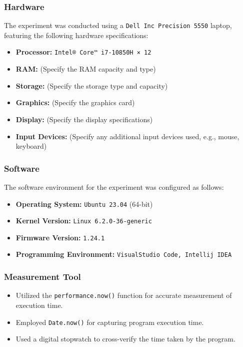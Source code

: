 \documentclass{article}
\begin{document}
\subsubsection*{Hardware}
The experiment was conducted using a \texttt{Dell Inc Precision 5550} laptop, featuring the following hardware specifications:
\begin{itemize}
  \item \textbf{Processor:} \texttt{Intel® Core™ i7-10850H × 12}
  \item \textbf{RAM:} (Specify the RAM capacity and type)
  \item \textbf{Storage:} (Specify the storage type and capacity)
  \item \textbf{Graphics:} (Specify the graphics card)
  \item \textbf{Display:} (Specify the display specifications)
  \item \textbf{Input Devices:} (Specify any additional input devices used, e.g., mouse, keyboard)
\end{itemize}

\subsubsection*{Software}
The software environment for the experiment was configured as follows:
\begin{itemize}
  \item \textbf{Operating System:} \texttt{Ubuntu 23.04} (64-bit)
  \item \textbf{Kernel Version:} \texttt{Linux 6.2.0-36-generic}
  \item \textbf{Firmware Version:} \texttt{1.24.1}
  \item \textbf{Programming Environment:} \texttt{VisualStudio Code, Intellij IDEA}
\end{itemize}

\subsubsection*{Measurement Tool}
    \begin{itemize}
      \item Utilized the \texttt{performance.now()} function for accurate measurement of execution time.
      \item Employed \texttt{Date.now()} for capturing program execution time.
      \item Used a digital stopwatch to cross-verify the time taken by the program.
    \end{itemize}
\end{document}
